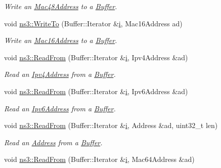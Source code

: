 \begin{DoxyCompactItemize}
\begin{DoxyCompactList}\small\item\em Write an \hyperlink{classns3_1_1Mac48Address}{Mac48\+Address} to a \hyperlink{classns3_1_1Buffer}{Buffer}. \end{DoxyCompactList}\item 
void \hyperlink{namespacens3_a908523d5ea187cffc78306222f9f6f08}{ns3\+::\+Write\+To} (Buffer\+::\+Iterator \&\hyperlink{lte__uplink__power__control_8m_a6f6ccfcf58b31cb6412107d9d5281426}{i}, Mac16\+Address ad)
\begin{DoxyCompactList}\small\item\em Write an \hyperlink{classns3_1_1Mac16Address}{Mac16\+Address} to a \hyperlink{classns3_1_1Buffer}{Buffer}. \end{DoxyCompactList}\item 
void \hyperlink{namespacens3_aeeba9f1570f031f9e401f76f51943805}{ns3\+::\+Read\+From} (Buffer\+::\+Iterator \&\hyperlink{lte__uplink__power__control_8m_a6f6ccfcf58b31cb6412107d9d5281426}{i}, Ipv4\+Address \&ad)
\begin{DoxyCompactList}\small\item\em Read an \hyperlink{classns3_1_1Ipv4Address}{Ipv4\+Address} from a \hyperlink{classns3_1_1Buffer}{Buffer}. \end{DoxyCompactList}\item 
void \hyperlink{namespacens3_a67001810e29fd2fde4394e59a358c440}{ns3\+::\+Read\+From} (Buffer\+::\+Iterator \&\hyperlink{lte__uplink__power__control_8m_a6f6ccfcf58b31cb6412107d9d5281426}{i}, Ipv6\+Address \&ad)
\begin{DoxyCompactList}\small\item\em Read an \hyperlink{classns3_1_1Ipv6Address}{Ipv6\+Address} from a \hyperlink{classns3_1_1Buffer}{Buffer}. \end{DoxyCompactList}\item 
void \hyperlink{namespacens3_a08dd06737df2cd4ada36c07794496f61}{ns3\+::\+Read\+From} (Buffer\+::\+Iterator \&\hyperlink{lte__uplink__power__control_8m_a6f6ccfcf58b31cb6412107d9d5281426}{i}, Address \&ad, uint32\+\_\+t len)
\begin{DoxyCompactList}\small\item\em Read an \hyperlink{classns3_1_1Address}{Address} from a \hyperlink{classns3_1_1Buffer}{Buffer}. \end{DoxyCompactList}\item 
void \hyperlink{namespacens3_a9cd4c5f4a363c1424798b8c91d29cac7}{ns3\+::\+Read\+From} (Buffer\+::\+Iterator \&\hyperlink{lte__uplink__power__control_8m_a6f6ccfcf58b31cb6412107d9d5281426}{i}, Mac64\+Address \&ad)

\end{DoxyCompactItemize}

